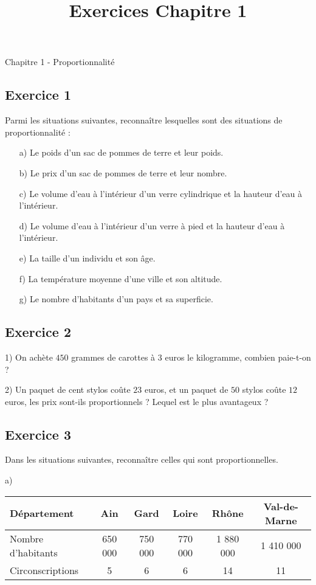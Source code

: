 \documentclass[12 pt]{extarticle}
\title{Exercices Chapitre 1}
\date{}
\theoremstyle{plain}
\begin{document}
\begin{center}{\Large Chapitre 1 - Proportionnalité}\\
 \end{center} 

\subsection*{Exercice 1}

Parmi les situations suivantes, reconnaître lesquelles sont des situations de proportionnalité : \begin{itemize}
\item[a)] Le poids d'un sac de pommes de terre et leur poids.
\item[b)] Le prix d'un sac de pommes de terre et leur nombre.
\item[c)] Le volume d'eau à l'intérieur d'un verre cylindrique 
et la hauteur d'eau à l'intérieur. 
\item[d)] Le volume d'eau à l'intérieur d'un verre à pied
et la hauteur d'eau à l'intérieur. 
\item[e)] La taille d'un individu et son âge.
\item[f)] La température moyenne d'une ville et son altitude. 
\item[g)] Le nombre d'habitants d'un pays et sa superficie. 
\end{itemize}

\subsection*{Exercice 2}

1) On achète $450$ grammes de carottes à $3$ euros le kilogramme, combien paie-t-on ? 

2) Un paquet de cent stylos coûte $23$ euros, et un paquet de $50$ 
stylos coûte $12$ euros, les prix sont-ils proportionnels ? Lequel est le plus avantageux ?

\subsection*{Exercice 3}

Dans les situations suivantes, reconnaître celles qui sont proportionnelles. 

a) \begin{tabular}{|l | c |c | c| c|c| }\hline
Département & Ain & Gard & Loire & Rhône & Val-de-Marne\\
\hline
Nombre d'habitants & 650 000 & 750 000  & 770 000 & 1 880 000 &1 410 000 \\
Circonscriptions & 5 & 6 & 6 & 14 & 11 \\ \hline
\end{tabular} 
\end{document}
